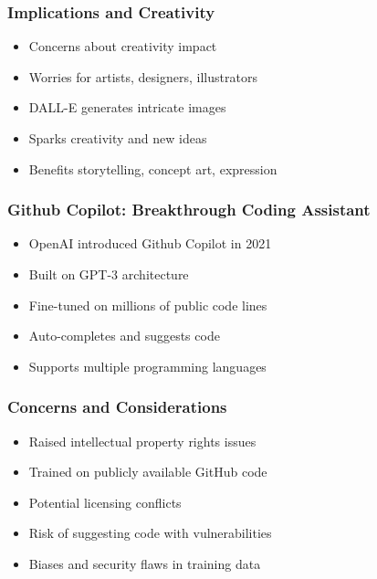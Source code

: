 \begin{frame}[fragile]\frametitle{Implications and Creativity}
    
    \begin{itemize}
        \item Concerns about creativity impact
        \item Worries for artists, designers, illustrators
        \item DALL-E generates intricate images
        \item Sparks creativity and new ideas
        \item Benefits storytelling, concept art, expression
    \end{itemize}
\end{frame}


\begin{frame}[fragile]\frametitle{Github Copilot: Breakthrough Coding Assistant}
    
    \begin{itemize}
        \item OpenAI introduced Github Copilot in 2021
        \item Built on GPT-3 architecture
        \item Fine-tuned on millions of public code lines
        \item Auto-completes and suggests code
        \item Supports multiple programming languages
    \end{itemize}
\end{frame}

\begin{frame}[fragile]\frametitle{Concerns and Considerations}
    
    \begin{itemize}
        \item Raised intellectual property rights issues
        \item Trained on publicly available GitHub code
        \item Potential licensing conflicts
        \item Risk of suggesting code with vulnerabilities
        \item Biases and security flaws in training data
    \end{itemize}
\end{frame}


